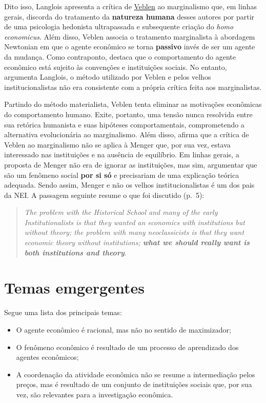 \documentclass[9pt,twocolumn,twoside,lineno]{style}
\begin{document}
Dito isso, Langlois apresenta a crítica de \underline{Veblen} ao marginalismo que, em linhas gerais, discorda do tratamento da \textbf{natureza humana} desses autores por partir de uma psicologia hedonista ultrapassada e subsequente criação do \textit{homo economicus}. Além disso, Veblen associa o tratamento marginalista à abordagem Newtonian em que o agente econômico se torna \textbf{passivo} invés de ser um agente da mudança. Como contraponto, destaca que o comportamento do agente econômico está sujeito às convenções e instituições sociais. No entanto, argumenta Langlois, o método utilizado por Veblen e pelos velhos institucionalistas não era consistente com a própria crítica feita aos marginalistas.

Partindo do método materialista, Veblen tenta eliminar as motivações econômicas do comportamento humano. Exite, portanto, uma tensão nunca resolvida entre sua retórica humanista e suas hipóteses comportamentais, comprometendo a alternativa evolucionária ao marginalismo. Além disso, afirma que a crítica de Veblen ao marginalismo não se aplica à Menger que, por sua vez, estava interessado nas instituições e na ausência de equilíbrio. Em linhas gerais, a proposta de Menger não era de ignorar as instituições, mas sim, argumentar que são um fenômeno social \textbf{por si só} e precisariam de uma explicação teórica adequada. Sendo assim, Menger e não os velhos institucionalistas é um dos pais da NEI. A passagem seguinte resume o que foi discutido (p.~5):

\begin{quote}
	\textit{The problem with the Historical
	School and many of the early Institutionalists is that they wanted an
	economics with institutions but without theory; the problem with many
	neoclassicists is that they want economic theory without institutions;
	\textbf{what we should really want is both institutions and theory}}.
\end{quote}

\section{Temas emgergentes}

Segue uma lista dos principais temas:

\begin{itemize}
	\item O agente econômico é racional, mas não no sentido de maximizador;
	\item O fenômeno econômico é resultado de um processo de aprendizado dos agentes econômicos;
	\item A coordenação da atividade econômica não se resume a intermediação pelos preços, mas é resultado de um conjunto de instituições sociais que, por sua vez, são relevantes para a investigação econômica.
\end{itemize}
\end{document}
